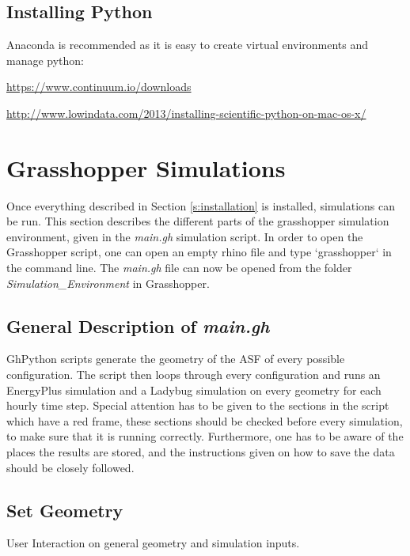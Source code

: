 	\subsection{Installing Python}
	Anaconda is recommended as it is easy to create virtual environments and manage python:

	\url{https://www.continuum.io/downloads}\\


	\url{http://www.lowindata.com/2013/installing-scientific-python-on-mac-os-x/}\\



\section{Grasshopper Simulations}

	
	Once everything described in Section \ref{s:installation} is installed, simulations can be run. This section describes the different parts of the grasshopper simulation environment, given in the \emph{main.gh} simulation script. In order to open the Grasshopper script, one can open an empty rhino file and type `grasshopper` in the command line. The \emph{main.gh} file can now be opened from the folder \emph{Simulation\_Environment} in Grasshopper.



	\subsection{General Description of \emph{main.gh}}
		GhPython scripts generate the geometry of the ASF of every possible configuration. The script then loops through every configuration and runs an EnergyPlus simulation and a Ladybug simulation on every geometry for each hourly time step. Special attention has to be given to the sections in the script which have a red frame, these sections should be checked before every simulation, to make sure that it is running correctly. Furthermore, one has to be aware of the places the results are stored, and the instructions given on how to save the data should be closely followed. 



	\subsection{Set Geometry}
	User Interaction on general geometry and simulation inputs.

